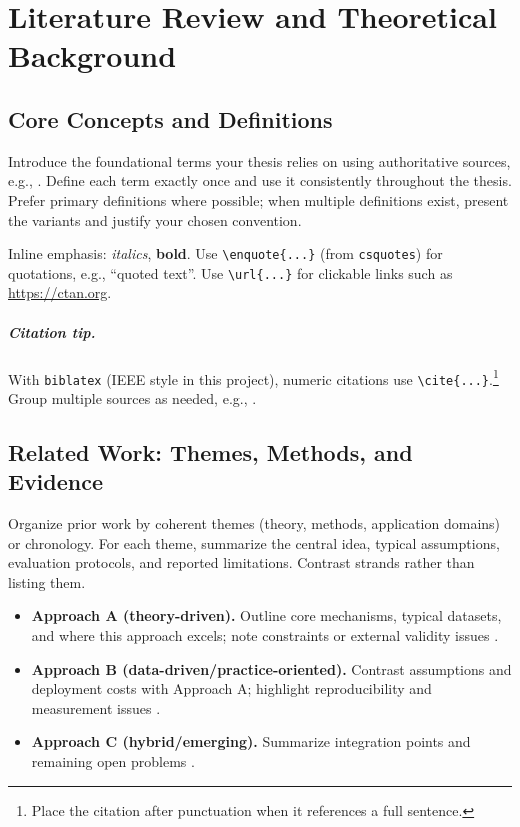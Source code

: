 \chapter{Literature Review and Theoretical Background}
\label{chap:litreview}


\section{Core Concepts and Definitions}
\label{sec:concepts}
Introduce the foundational terms your thesis relies on using authoritative sources, e.g., \cite{porter2008,laudon2015}. Define each term exactly once and use it consistently throughout the thesis. Prefer primary definitions where possible; when multiple definitions exist, present the variants and justify your chosen convention.

Inline emphasis: \emph{italics}, \textbf{bold}. Use \verb|\enquote{...}| (from \texttt{csquotes}) for quotations, e.g., \enquote{quoted text}. Use \verb|\url{...}| for clickable links such as \url{https://ctan.org}.

\paragraph{Citation tip.}
With \texttt{biblatex} (IEEE style in this project), numeric citations use \verb|\cite{...}|.\footnote{Place the citation after punctuation when it references a full sentence.} Group multiple sources as needed, e.g., \cite{friedman2006,schmidt2014}.

\section{Related Work: Themes, Methods, and Evidence}
\label{sec:related}
Organize prior work by coherent themes (theory, methods, application domains) or chronology. For each theme, summarize the central idea, typical assumptions, evaluation protocols, and reported limitations. Contrast strands rather than listing them.

\begin{itemize}[leftmargin=1.2cm]
  \item \textbf{Approach A (theory-driven).} Outline core mechanisms, typical datasets, and where this approach excels; note constraints or external validity issues \cite{friedman2006}.
  \item \textbf{Approach B (data-driven/practice-oriented).} Contrast assumptions and deployment costs with Approach A; highlight reproducibility and measurement issues \cite{laudon2015}.
  \item \textbf{Approach C (hybrid/emerging).} Summarize integration points and remaining open problems \cite{schmidt2014}.
\end{itemize}

